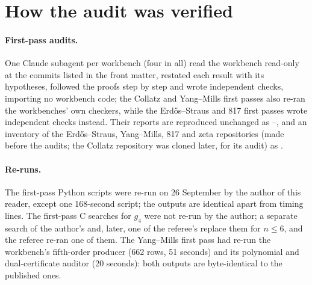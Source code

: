 \section{How the audit was verified}\label{app:wverification}

\paragraph{First-pass audits.} One Claude subagent per workbench (four in all) read the workbench read-only at the commits listed in the front matter, restated each result with its hypotheses, followed the proofs step by step and wrote independent checks, importing no workbench code; the Collatz and Yang--Mills first passes also re-ran the workbenches' own checkers, while the Erdős--Straus and 817 first passes wrote independent checks instead. Their reports are reproduced unchanged as --, and an inventory of the Erdős--Straus, Yang--Mills, 817 and zeta repositories (made before the audits; the Collatz repository was cloned later, for its audit) as .

\paragraph{Re-runs.} The first-pass Python scripts were re-run on 26 September by the author of this reader, except one 168-second script; the outputs are identical apart from timing lines. The first-pass C searches for $g_4$ were not re-run by the author; a separate search of the author's and, later, one of the referee's replace them for $n\le6$, and the referee re-ran one of them. The Yang--Mills first pass had re-run the workbench's fifth-order producer (662 rows, 51 seconds) and its polynomial and dual-certificate auditor (20 seconds): both outputs are byte-identical to the published ones.

